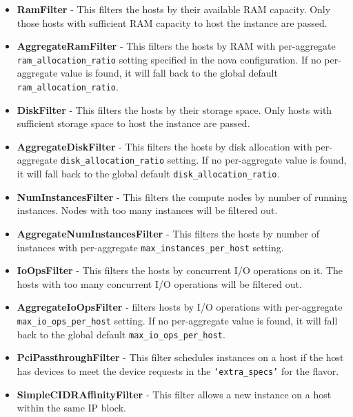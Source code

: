 \begin{itemize}
    \item \textbf{RamFilter} - This filters the hosts by their available RAM capacity. Only those hosts with sufficient RAM capacity to host the instance are passed.

    \item \textbf{AggregateRamFilter} - This filters the hosts by RAM with per-aggregate \\\verb|ram_allocation_ratio| setting specified in the nova configuration. If no per-aggregate value is found, it will fall back to the global default \\\verb|ram_allocation_ratio|. 

    \item \textbf{DiskFilter} - This filters the hosts by their storage space. Only hosts with sufficient storage space to host the instance are passed.

    \item \textbf{AggregateDiskFilter} - This filters the hosts by disk allocation with per-aggregate \verb|disk_allocation_ratio| setting. If no per-aggregate value is found, it will fall back to the global default \verb|disk_allocation_ratio|.

    \item \textbf{NumInstancesFilter} - This filters the compute nodes by number of running instances. Nodes with too many instances will be filtered out.

    \item \textbf{AggregateNumInstancesFilter} - This filters the hosts by number of instances with per-aggregate \verb|max_instances_per_host| setting.

    \item \textbf{IoOpsFilter} - This filters the hosts by concurrent I/O operations on it. The hosts with too many concurrent I/O operations will be filtered out.

    \item \textbf{AggregateIoOpsFilter} - filters hosts by I/O operations with per-aggregate \verb|max_io_ops_per_host| setting. If no per-aggregate value is found, it will fall back to the global default \verb|max_io_ops_per_host|.

    \item \textbf{PciPassthroughFilter} - This filter schedules instances on a host if the host has devices to meet the device requests in the \verb|‘extra_specs’| for the flavor.

    \item \textbf{SimpleCIDRAffinityFilter} - This filter allows a new instance on a host within the same IP block.


\end{itemize}
